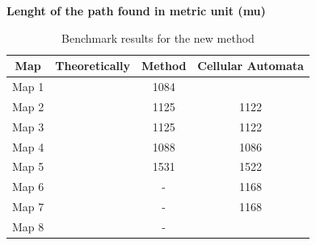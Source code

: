 \documentclass[../main.tex]{subfiles}
\begin{document}
\textbf{Lenght of the path found in metric unit (mu)}
\begin{table}[H]
	\centering
	\begin{tabular}{c c c c}
		\hline
		Map & Theoretically & Method & Cellular Automata \\
		\hline
		Map 1 &  & 1084 &  \\
		Map 2 &  & 1125 & 1122 \\
		Map 3 &  & 1125 & 1122 \\
		Map 4 &  & 1088 & 1086 \\
		Map 5 &  & 1531 & 1522 \\
		Map 6 &  & - & 1168 \\
		Map 7 &  & - & 1168 \\
		Map 8 &  & - &  \\
		\hline
	\end{tabular}
	\caption{Benchmark results for the new method}
	\label{tab:benchmark_results}
\end{table}
\end{document}
